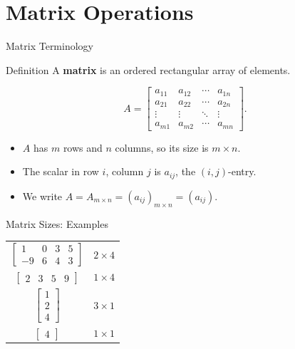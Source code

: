 \section[Matrix operations]{Matrix Operations}


\begin{frame}{Matrix Terminology}
\begin{block}{Definition}
A \textbf{matrix} is an ordered rectangular array of elements.
\end{block}
\[
A=\begin{bmatrix}
a_{11}&a_{12}&\cdots&a_{1n}\\
a_{21}&a_{22}&\cdots&a_{2n}\\
\vdots&\vdots&\ddots&\vdots\\
a_{m1}&a_{m2}&\cdots&a_{mn}
\end{bmatrix}.
\]
\begin{itemize}
  \item $A$ has $m$ rows and $n$ columns, so its size is $m\times n$.
  \item The scalar in row $i$, column $j$ is $a_{ij}$, the $(i,j)$-entry.
  \item We write $A=A_{m\times n}=(a_{ij})_{m\times n}=(a_{ij})$.
\end{itemize}
\end{frame}

\begin{frame}{Matrix Sizes: Examples}
\centering
\renewcommand{\arraystretch}{1.25}
\begin{tabular}{c@{\qquad}c}
$\begin{bmatrix}1&0&3&5\\-9&6&4&3\end{bmatrix}$ & $2\times4$\\[3ex]
$\begin{bmatrix}2&3&5&9\end{bmatrix}$ & $1\times4$\\[3ex]
$\begin{bmatrix}1\\2\\4\end{bmatrix}$ & $3\times1$\\[3ex]
$\begin{bmatrix}4\end{bmatrix}$ & $1\times1$
\end{tabular}
\end{frame}

